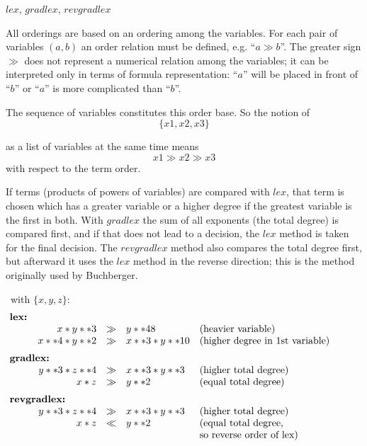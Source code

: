 \begin{center}
$lex$, $gradlex$, $revgradlex$
\end{center}

All orderings are based on an ordering among the variables. For
each pair of variables $(a,b)$ an order relation must be defined, e.g.
``$ a\gg b $''. The greater sign $\gg$  does not represent a numerical
relation among the variables; it can be interpreted only in terms of
formula representation: ``$a$'' will be placed in front of ``$b$'' or
``$a$''  is more complicated than ``$b$''.

The sequence of variables constitutes this order base. So the notion
of
\[ \{x1,x2,x3\} \]

as a list of variables at the same time means
\[ x1 \gg x2 \gg x3 \]
with respect to the term order.

If terms (products of powers of variables) are compared with $lex$,
that term is chosen which has a greater variable or a higher degree
if the greatest variable is the first in both. With $gradlex$ the sum of
all exponents (the total degree) is compared first, and if that does
not lead to a decision, the $lex$ method is taken for the final decision.
The $revgradlex$ method also compares the total degree first, but
afterward it uses the $lex$ method in the reverse direction; this is the
method originally used by Buchberger.

\example \ with $\{x,y,z\}$: 
\[
\begin{array}{rlll}
\multicolumn{2}{l}{\hspace*{-1cm}\mbox{\bf lex:}}\\
 x * y **3 & \gg & y ** 48 & \mbox{(heavier variable)} \\
 x**4 * y**2 & \gg  & x**3 * y**10 & \mbox{(higher degree in 1st
variable)} \vspace*{2mm} \\
\multicolumn{2}{l}{\hspace*{-1cm}\mbox{\bf gradlex:}} \\
  y**3 * z**4 & \gg & x**3 * y**3 & \mbox{(higher total degree)} \\
  x*z  &        \gg & y**2  & \mbox{(equal total degree)}
\vspace*{2mm}\\
\multicolumn{2}{l}{\hspace*{-1cm}\mbox{\bf
revgradlex:}} \\
 y**3 * z**4 & \gg &  x**3 * y**3 & \mbox{(higher total degree)} \\
 x*z         & \ll  &  y**2       & \mbox{(equal total degree,} \\
 & & & \mbox{so reverse order of lex)}
\end{array}
\]

